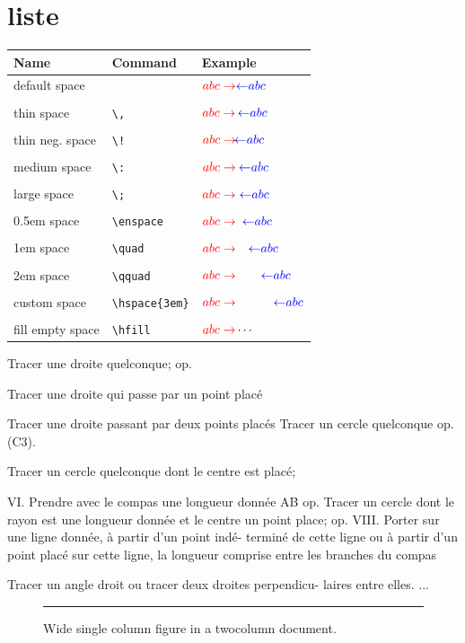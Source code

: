\documentclass[12pt,a4paper,twocolumn]{book} %
\newcommand\rlArrow[1]{$\color{red}{abc \rightarrow} #1 \color{blue}{\leftarrow} abc$\\}
\begin{document}
\section{liste}
\begin{tabular}{lll}
  \hline
  Name & Command & Example\\
  \hline
  default space & & \rlArrow{}\\
  thin space & \verb|\,| & \rlArrow{\,}\\
  thin neg. space & \verb|\!| & \rlArrow{\!}\\
  medium space & \verb|\:| & \rlArrow{\:}\\
  large space & \verb|\;| & \rlArrow{\;}\\
  0.5em space & \verb|\enspace| & \rlArrow{\enspace}\\
  1em space & \verb|\quad| & \rlArrow{\quad}\\
  2em space & \verb|\qquad| & \rlArrow{\qquad}\\
  custom space & \verb|\hspace{3em}| & \rlArrow{\hspace{3em}}\\
  fill empty space & \verb|\hfill| & $\color{red}{abc \rightarrow} \color{black}\cdots$\\
  \hline
\end{tabular}
\begin{turn}{45}
  \begin{minipage}{\linewidth}
    Tracer une droite quelconque; op.

    Tracer une droite qui passe par un point placé

    Tracer une droite passant par deux points placés
    Tracer un cercle quelconque op. (C3).

    Tracer un cercle quelconque dont le centre est placé;

    VI. Prendre avec le compas une longueur donnée AB
    op.
    Tracer un cercle dont le rayon est une longueur donnée
    et le centre un point place; op.
    VIII. Porter sur une ligne donnée, à partir d'un point indé-
    terminé de cette ligne ou à partir d'un point placé
    sur cette ligne, la longueur comprise entre les branches du compas

    Tracer un angle droit ou tracer deux droites perpendicu-
    laires entre elles.
    ...

  \end{minipage}

\end{turn}
\begin{figure}[ht]
  \centering
  \rule{\linewidth}{3cm}
  \caption{Wide single column figure in a twocolumn document.}
\end{figure}
\end{document}
